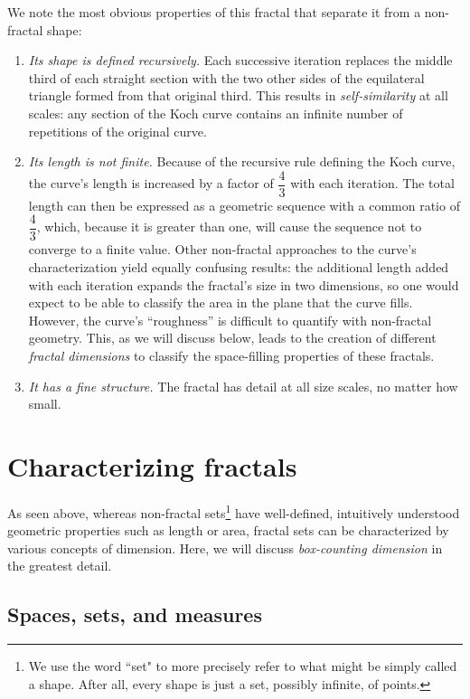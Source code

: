 We note the most obvious properties of this fractal that separate it from a non-fractal shape:
\begin{enumerate}
\item \textit{Its shape is defined recursively.} Each successive iteration replaces the middle third of each straight section with the two other sides of the equilateral triangle formed from that original third. This results in \textit{self-similarity} at all scales: any section of the Koch curve contains an infinite number of repetitions of the original curve.
\item \textit{Its length is not finite.} Because of the recursive rule defining the Koch curve, the curve's length is increased by a factor of $ \dfrac{4}{3} $ with each iteration. The total length can then be expressed as a geometric sequence with a common ratio of $ \dfrac{4}{3} $, which, because it is greater than one, will cause the sequence not to converge to a finite value. Other non-fractal approaches to the curve's characterization yield equally confusing results: the additional length added with each iteration expands the fractal's size in two dimensions, so one would expect to be able to classify the area in the plane that the curve fills. However, the curve's ``roughness'' is difficult to quantify with non-fractal geometry. This, as we will discuss below, leads to the creation of different \textit{fractal dimensions} to classify the space-filling properties of these fractals.
\item \textit{It has a fine structure.} The fractal has detail at all size scales, no matter how small\citep{fractaltextbook}.
\end{enumerate}


\section{Characterizing fractals}

As seen above, whereas non-fractal sets\footnote{We use the word ``set" to more precisely refer to what might be simply called a shape. After all, every shape is just a set, possibly infinite, of points.}  have well-defined, intuitively understood geometric properties such as length or area, fractal sets can be characterized by various concepts of dimension. Here, we will discuss \textit{box-counting dimension} in the greatest detail.

\subsection{Spaces, sets, and measures}

